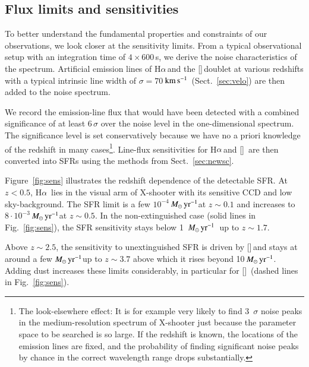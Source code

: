 \documentclass[traditabstract, longauth]{aa}
\newcommand{\kms}{$\rm{km\,s^{-1}}$}
\newcommand{\ha}{H$\alpha$}
\newcommand{\oii}{[\ion{O}{ii}]}
\newcommand{\Msunyr}{$M_\odot\,\rm{yr}^{-1}$}
\begin{document}
\subsection{Flux limits and sensitivities}
\label{sec:sens}

To better understand the fundamental properties and constraints of our observations, we look closer at the sensitivity limits. From a typical observational setup with an integration time of $4\times600$\,s, we derive the noise characteristics of the spectrum. Artificial emission lines of \ha\,and the \oii\,doublet at various redshifts with a typical intrinsic line width of $\sigma= 70$\,\kms\, (Sect.~\ref{sec:velo}) are then added to the noise spectrum. 

We record the emission-line flux that would have been detected with a combined significance of at least 6\,$\sigma$ over the noise level in the one-dimensional spectrum. The significance level is set conservatively because we have no a priori knowledge of the redshift in many cases\footnote{The look-elsewhere effect: It is for example very likely to find 3~$\sigma$ noise peaks in the medium-resolution spectrum of X-shooter just because the parameter space to be searched is so large. If the redshift is known, the locations of the emission lines are fixed, and the probability of finding significant noise peaks by chance in the correct wavelength range drops substantially.}. Line-flux sensitivities for \ha\,and \oii\, are then converted into SFRs using the methods from Sect.~\ref{sec:newsc}.

Figure~\ref{fig:sens} illustrates the redshift dependence of the detectable SFR. At $z<0.5$, \ha\, lies in the visual arm of X-shooter with its sensitive CCD and low sky-background. The SFR limit is a few $10^{-4}$\,\Msunyr at $z\sim0.1$ and increases to $8\cdot10^{-3}$\,\Msunyr at $z\sim0.5$. In the non-extinguished case (solid lines in Fig.~\ref{fig:sens}), the SFR sensitivity stays below 1~\Msunyr\, up to $z\sim1.7$.

Above $z\sim2.5$, the sensitivity to unextinguished SFR is driven by \oii\,and stays at around a few \Msunyr up to $z\sim3.7$ above which it rises beyond 10\,\Msunyr. Adding dust increases these limits considerably, in particular for \oii\, (dashed lines in Fig.~\ref{fig:sens}). 
\end{document}
